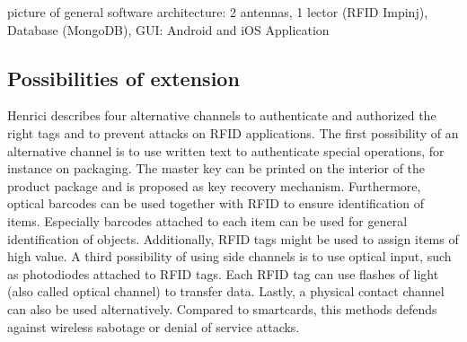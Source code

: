 picture of general software architecture: 
2 antennas, 1 lector (RFID Impinj), Database (MongoDB), GUI: Android and  iOS Application 

\subsection{Possibilities of extension}

Henrici \cite[p.121 ff.]{henrici} describes four alternative channels to authenticate and authorized the right tags and to prevent attacks on RFID applications. 
The first possibility of an alternative channel is to use written text to authenticate special operations, for instance on packaging. The master key can be printed on the interior of the product package and is proposed as key recovery mechanism.
Furthermore, optical barcodes can be used together with RFID to ensure identification of items. Especially barcodes attached to each item can be used for general identification of objects. Additionally, RFID tags might be used to assign items of high value.
A third possibility of using side channels is to use optical input, such as photodiodes attached to RFID tags. Each RFID tag can use flashes of light (also called optical channel) to transfer data.   
Lastly, a physical contact channel can also be used alternatively. Compared to smartcards, this methods defends against wireless sabotage or denial of service attacks.


















 
